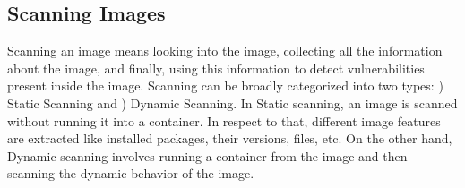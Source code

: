\documentclass[a4paper,num-refs]{oup-contemporary}
\newcommand{\rom}[1]{\lowercase\expandafter{\romannumeral #1\relax}}
\newcommand{\TG}[1]{\color{blue}From Tristan: #1\color{black}}
\begin{document}

\subsection{Scanning Images}

Scanning an image means looking into the image, collecting all the information about the image, and
finally, using this information to detect vulnerabilities present inside the image.
Scanning can be broadly categorized into two types: \rom{1}) Static Scanning and \rom{2})
Dynamic Scanning.
In Static scanning, an image is scanned without running it into a container. In respect to that,
different image features are extracted like installed packages, their versions, files, etc.
On the other hand, Dynamic scanning involves running a container from the image and then scanning the
dynamic behavior of the image.
\end{document}
